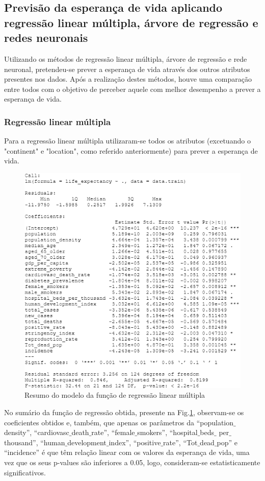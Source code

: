 \documentclass[conference]{IEEEtran}
\begin{document}
\subsection{Previsão da esperança de vida aplicando regressão linear múltipla, árvore de regressão e redes neuronais}
Utilizando os métodos de regressão linear múltipla, árvore de regressão e rede neuronal, pretendeu-se prever a esperança de vida através dos outros atributos presentes nos dados. Após a realização destes métodos, houve uma comparação entre todos com o objetivo de perceber aquele com melhor desempenho a prever a esperança de vida.

\subsubsection{Regressão linear múltipla}
Para a regressão linear múltipla utilizaram-se todos os atributos (excetuando o "continent" e "location", como referido anteriormente) para prever a esperança de vida.

\begin{figure}[htbp]
\centerline{\includegraphics[width=0.95\columnwidth]{images/04_1.png}}
\caption{Resumo do modelo da função de regressão linear múltipla}
\label{4a}
\end{figure}

No sumário da função de regressão obtida, presente na Fig.\ref{4a}, observam-se os coeficientes obtidos e, também, que apenas os parâmetros da “population$\_$density”, “cardiovasc$\_$death$\_$rate”, “female$\_$smokers”, “hospital$\_$beds$\_$ per$\_$thousand”, “human$\_$development$\_$index”, “positive$\_$rate”, “Tot$\_$dead$\_$pop” e “incidence” é que têm relação linear com os valores da esperança de vida, uma vez que os seus p-values são inferiores a 0.05, logo, consideram-se estatisticamente significativos.
\end{document}
